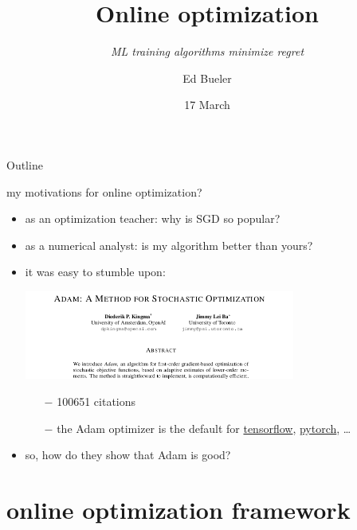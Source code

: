 \documentclass[xcolor={svgnames},
               hyperref={colorlinks,citecolor=DeepPink4,linkcolor=FireBrick,urlcolor=Maroon}]
               {beamer}
\title{Online optimization}
\subtitle{\emph{ML training algorithms minimize regret}}
\author{Ed Bueler}
\institute[UAF]{MATH 692 Mathematics for Machine Learning}
\date[Spring 2022]{17 March}
\begin{document}
\beamertemplatenavigationsymbolsempty

\begin{frame}
  \maketitle
\end{frame}


\begin{frame}{Outline}
  \tableofcontents[hideallsubsections]
\end{frame}


\begin{frame}{my motivations for online optimization?}

\begin{itemize}
\item as an optimization teacher: why is SGD so popular?
\item as a numerical analyst: is my algorithm better than yours?

\medskip
\item it was easy to stumble upon:

\begin{center}
\includegraphics[width=0.7\textwidth]{figs/adam-paper.png}
\end{center}

\medskip
    \begin{itemize}
    \item[$-$] 100651 citations
    \item[$-$] the Adam optimizer is the default for \href{https://www.tensorflow.org/tutorials/keras/classification}{tensorflow}, \href{https://pytorch.org/docs/stable/optim.html}{pytorch}, \dots
    \end{itemize}

\medskip
\item so, how do they show that Adam is good?
\end{itemize}
\end{frame}


\section{online optimization framework}
\end{document}
